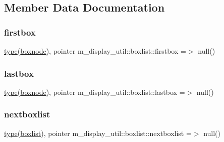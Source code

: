 \subsection{Member Data Documentation}
\mbox{\label{structm__display__util_1_1boxlist_ada3bfedc8682447158b2b0e4b662773a}} 
\subsubsection{\texorpdfstring{firstbox}{firstbox}}
{\footnotesize\ttfamily \hyperlink{stop__watch_83_8txt_a70f0ead91c32e25323c03265aa302c1c}{type}(\hyperlink{structm__display__util_1_1boxnode}{boxnode}), pointer m\+\_\+display\+\_\+util\+::boxlist\+::firstbox =$>$ null()\hspace{0.3cm}{\ttfamily [private]}}

\mbox{\label{structm__display__util_1_1boxlist_ada85bf1694f8522fa4f401c7e7dd34d3}} 
\subsubsection{\texorpdfstring{lastbox}{lastbox}}
{\footnotesize\ttfamily \hyperlink{stop__watch_83_8txt_a70f0ead91c32e25323c03265aa302c1c}{type}(\hyperlink{structm__display__util_1_1boxnode}{boxnode}), pointer m\+\_\+display\+\_\+util\+::boxlist\+::lastbox =$>$ null()\hspace{0.3cm}{\ttfamily [private]}}

\mbox{\label{structm__display__util_1_1boxlist_a51aeeb63272988f526937af58361c577}} 
\subsubsection{\texorpdfstring{nextboxlist}{nextboxlist}}
{\footnotesize\ttfamily \hyperlink{stop__watch_83_8txt_a70f0ead91c32e25323c03265aa302c1c}{type}(\hyperlink{structm__display__util_1_1boxlist}{boxlist}), pointer m\+\_\+display\+\_\+util\+::boxlist\+::nextboxlist =$>$ null()\hspace{0.3cm}{\ttfamily [private]}}


